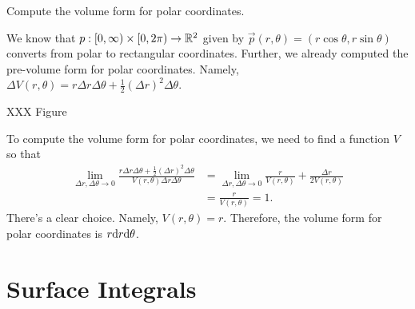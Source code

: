 \begin{example}
	Compute the volume form for polar coordinates.

	We know that $p:[0,\infty)\times [0,2\pi)\to\mathbb{R}^2$ given 
	by $\vec p(r,\theta)=(r\cos\theta,r\sin\theta)$ converts from polar to rectangular
	coordinates.  Further, we already computed the pre-volume form for polar
	coordinates.  Namely, $\Delta V(r,\theta) = r\Delta r\Delta \theta+\tfrac{1}{2}(\Delta r)^2\Delta \theta$.

	XXX Figure


	To compute the volume form for polar coordinates, we need to find a function $V$ so that
	\begin{align*}
		\lim_{\Delta r,\Delta \theta\to 0}
		\frac{r\Delta r\Delta \theta+\tfrac{1}{2}(\Delta r)^2\Delta \theta}{V(r,\theta)\Delta r\Delta\theta}
		&=\lim_{\Delta r,\Delta \theta\to 0}
		\frac{r}{V(r,\theta)} + \frac{\Delta r}{2V(r,\theta)}\\
		&=\frac{r}{V(r,\theta)} = 1.
	\end{align*}
	There's a clear choice.  Namely, $V(r,\theta)=r$.  Therefore, the volume form for
	polar coordinates is $r\mathrm{d} r\mathrm{d} \theta$.

\end{example}

\begin{exercises}
\end{exercises}

\section{Surface Integrals}

\begin{exercises}
\end{exercises}
